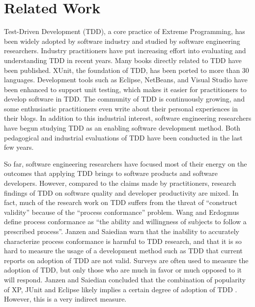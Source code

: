 \chapter{Related Work}
\label{ch:RelatedWork}

Test-Driven Development (TDD), a core practice of Extreme Programming, 
has been widely adopted by software industry and studied by software 
engineering researchers. Industry practitioners have put increasing 
effort into evaluating and understanding TDD in recent years. Many books \cite{Beck:03,Astels:03,Newkirk:04,Link:03,Hunt:03} directly related 
to TDD have been published. XUnit\cite{XUnit,xUnitFrameWork}, the 
foundation of TDD, has been ported to more than 30 languages. Development 
tools such as Eclipse, NetBeans, and Visual Studio have been enhanced
to support unit testing, which makes it easier for practitioners 
to develop software in TDD. The community of TDD \cite{TestDrivenWeb,TddYahooGroup} 
is continuously growing, and some enthusiastic practitioners 
\cite{HawleyBlog,ExtremeJSBlog,MemoRandaBlog,EichertBlog,MasonBlog} 
even write about their personal experiences in their blogs. In addition 
to this industrial interest, software engineering researchers have 
begun studying TDD as an enabling software development method. Both 
pedagogical\cite{Muller:02,Edwards:04,Matjaz:03,Erdogmus:05,Kaufmann:03} 
and industrial \cite{George:03,Maximilien:03,Geras:04,Williams:03,Bhat:06} 
evaluations of TDD have been conducted in the last few years.  

So far, software engineering researchers have focused most of their 
energy on the outcomes that applying TDD brings to software products 
and software developers. However, compared to the claims made by 
practitioners, research findings of TDD on software quality and 
developer productivity are mixed. In fact, much of the research work on TDD 
suffers from the threat of ``construct validity'' \cite{Wang:04} 
because of the ``process conformance'' problem. Wang and Erdogmus define 
process conformance as ``the ability and willingness of subjects to follow 
a prescribed process''. Janzen and Saiedian warn that the inability to 
accurately characterize process conformance is harmful to TDD research, 
and that it is so hard to measure the usage of a development method 
such as TDD that current reports on adoption of TDD are not valid. 
Surveys are often used to measure the adoption of TDD, but only those 
who are much in favor or much opposed to it will respond. Janzen and 
Saiedian concluded that the combination of popularity of XP, JUnit 
and Eclipse likely implies a certain degree of adoption of TDD 
\cite{Janzen:05}. However, this is a very indirect measure.

